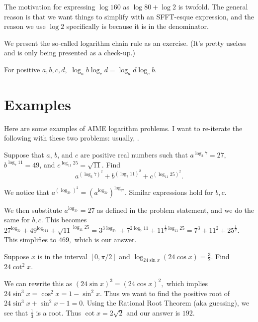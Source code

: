 The motivation for expressing $\log 160$ as $\log 80 + \log 2$ is twofold. The general reason is that we want things to simplify with an SFFT-esque expression, and the reason we use $\log 2$ specifically is because it is in the denominator.

We present the so-called logarithm chain rule as an exercise. (It's pretty useless and is only being presented as a check-up.)

\begin{exer}
For positive $a,b,c,d,$ $\log_{a}b\log_{c}d=\log_{a}d\log_{c}b.$
\end{exer}

\section{Examples}
Here are some examples of AIME logarithm problems. I want to re-iterate the following with these two problems: usually, .

\begin{exam}[AIME II 2009/2]
Suppose that $a$, $b$, and $c$ are positive real numbers such that $a^{\log_3 7} = 27$, $b^{\log_7 11} = 49$, and $c^{\log_{11}25} = \sqrt{11}$. Find
\[a^{(\log_3 7)^2} + b^{(\log_7 11)^2} + c^{(\log_{11} 25)^2}.\]
\end{exam}

\begin{sol} We notice that $a^{(\log_37)^2}=(a^{\log_37})^{\log_37}.$ Similar expressions hold for $b,c.$

We then substitute $a^{\log_37}=27$ as defined in the problem statement, and we do the same for $b,c$. This becomes $27^{\log_37}+49^{\log_711}+\sqrt{11}^{\log_{11}25}=3^{3\log_37}+7^{2\log_7{11}}+11^{\frac{1}{2}\log_{11}25}=7^3+11^2+25^{\frac{1}{2}}.$ This simplifies to $469,$ which is our answer.\end{sol}

\begin{exam}[AIME I 2011/9]
Suppose $x$ is in the interval $[0, \pi/2]$ and $\log_{24\sin x} (24\cos x)=\frac{3}{2}$. Find $24\cot^2 x$.
\end{exam}

\begin{sol}
We can rewrite this as $(24\sin x)^3=(24\cos x)^2,$ which implies $24\sin^3 x=\cos^2 x=1-\sin^2 x.$ Thus we want to find the positive root of $24\sin^3 x+\sin^2 x-1=0.$ Using the Rational Root Theorem (aka guessing), we see that $\frac{1}{3}$ is a root. Thus $\cot x=2\sqrt{2}$ and our answer is $192.$\end{sol}
